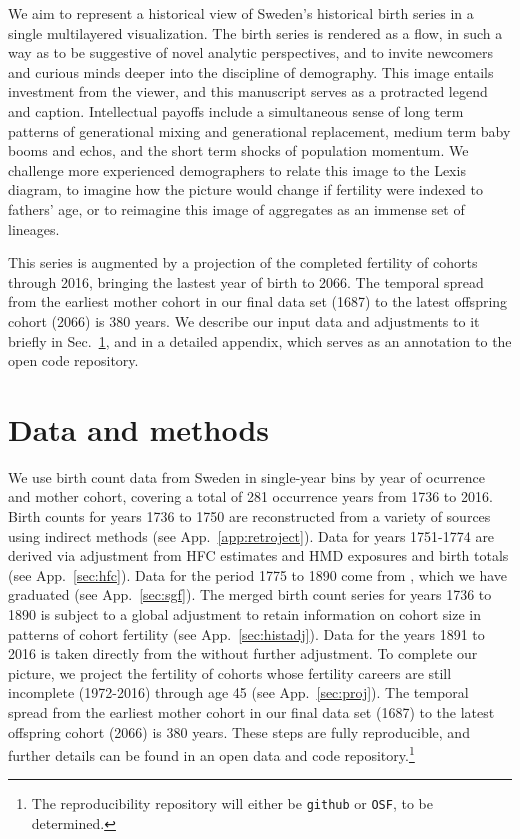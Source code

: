 \documentclass{article}
\begin{document}
We aim to represent a historical view of Sweden's historical birth series in a single multilayered visualization. The birth series is rendered as a flow, in such a way as to be suggestive of novel analytic perspectives, and to invite newcomers and curious minds deeper into the discipline of demography. This image entails investment from the viewer, and this manuscript serves as a protracted legend and caption. Intellectual payoffs include a simultaneous sense of long term patterns of generational mixing and generational replacement, medium term baby booms and echos, and the short term shocks of population momentum. We challenge more experienced demographers to relate this image to the Lexis diagram, to imagine how the picture would change if fertility were indexed to fathers' age, or to reimagine this image of aggregates as an immense set of lineages.

 This series is augmented by a projection of the completed fertility of cohorts through 2016, bringing the lastest year of birth to 2066. The temporal spread from the earliest mother cohort in our final data set (1687) to the latest offspring cohort (2066) is 380 years. We describe our input data and adjustments to it briefly in Sec.~\ref{sec:data}, and in a detailed appendix, which serves as an annotation to the open code repository.

\section{Data and methods}
\label{sec:data}
We use birth count data from Sweden in single-year bins by year of ocurrence and mother cohort, covering a total of 281 occurrence years from 1736 to 2016. Birth counts for years 1736 to 1750 are reconstructed from a variety of sources \citep{HFC, HMD, sweden1969historisk} using indirect methods (see App.~\ref{app:retroject}). Data for years 1751-1774 are derived via adjustment from HFC estimates and HMD exposures and birth totals (see App.~\ref{sec:hfc}). Data for the period 1775 to 1890 come from \citet{sgf1907}, which we have graduated (see App.~\ref{sec:sgf}). The merged birth count series for years 1736 to 1890 is subject to a global adjustment to retain information on cohort size in patterns of cohort fertility (see App.~\ref{sec:histadj}). Data for the years 1891 to 2016 is taken directly from the \citet{HFD} without further adjustment. To complete our picture, we project the fertility of cohorts whose fertility careers are still incomplete (1972-2016) through age 45 (see App.~\ref{sec:proj}). The temporal spread from the earliest mother cohort in our final data set (1687) to the latest offspring cohort (2066) is 380 years. These steps are fully reproducible, and further details can be found in an open data and code repository.\footnote{The reproducibility repository will either be \texttt{github} or \texttt{OSF}, to be determined.}
\end{document}
